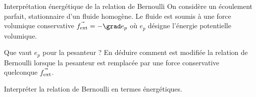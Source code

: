 \begin{exo}[PC][1][TD]{Interprétation énergétique de la relation de Bernoulli}
On  considère un écoulement parfait, stationnaire d’un fluide homogène. Le fluide est soumis à une force volumique conservative $\Vec{f_{\rm ext}} = - \grad e_p$ où $e_p$ désigne l’énergie potentielle volumique.

\begin{quest}

  \item Que vaut $e_p$ pour la pesanteur ? En déduire comment est modifiée la relation de Bernoulli lorsque la pesanteur est remplacée par une force conservative quelconque $\Vec{f_{\rm ext}}$.

\item Interpréter la relation de Bernoulli en termes énergétiques.

\end{quest}
\end{exo}

